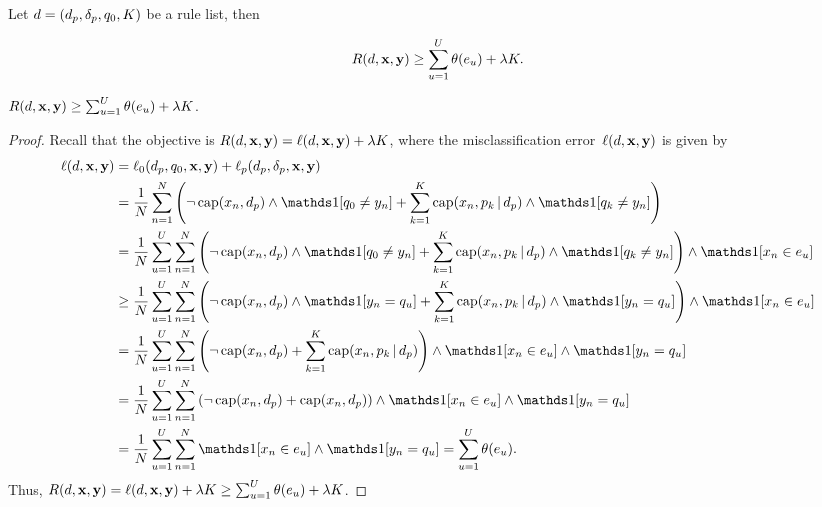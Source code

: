 \begin{proposition}
\label{prop:identical}
Let ${{d} = (d_p, \delta_p, q_0, K)}$ be a rule list, then
\begin{arxiv}
\begin{align}
R({d}, \mathbf{x}, \mathbf{y}) \ge \sum_{u=1}^U \theta(e_u) + {\lambda} K.
\end{align}
\end{arxiv}
\begin{kdd}
${R({d}, \mathbf{x}, \mathbf{y}) \ge \sum_{u=1}^U \theta(e_u) + {\lambda} K}$.
\end{kdd}
\end{proposition}

\begin{arxiv}
\begin{proof}
Recall that the objective is ${R({d}, \mathbf{x}, \mathbf{y}) = \ell({d}, \mathbf{x}, \mathbf{y}) + {\lambda} K}$,
where the misclassification error~${\ell({d}, \mathbf{x}, \mathbf{y})}$ is given by
\begin{align}
\Loss(\RL, \x, \y) &= \Loss_0(\Prefix, \Default, \x, \y) + \Loss_p(\Prefix, \Labels, \x, \y) \nn \\
&= \frac{1}{N} \sum_{n=1}^N \left( \neg\, \Cap(x_n, \Prefix) \wedge \one[q_0 \neq y_n]
   + \sum_{k=1}^K \Cap(x_n, p_k \given \Prefix) \wedge \one [q_k \neq y_n] \right) \nn \\
&= \frac{1}{N} \sum_{u=1}^U \sum_{n=1}^N \left( \neg\, \Cap(x_n, \Prefix) \wedge \one[q_0 \neq y_n]
   + \sum_{k=1}^K \Cap(x_n, p_k \given \Prefix) \wedge \one [q_k \neq y_n] \right)
   \wedge \one [x_n \in e_u]  \nn \\
&\ge \frac{1}{N} \sum_{u=1}^U \sum_{n=1}^N \left( \neg\, \Cap(x_n, \Prefix) \wedge \one[y_n = q_u]
   + \sum_{k=1}^K \Cap(x_n, p_k \given \Prefix) \wedge \one [y_n = q_u] \right)
   \wedge \one [x_n \in e_u] \nn \\
&= \frac{1}{N} \sum_{u=1}^U \sum_{n=1}^N \left( \neg\, \Cap(x_n, \Prefix)
   + \sum_{k=1}^K \Cap(x_n, p_k \given \Prefix) \right)
   \wedge \one [x_n \in e_u] \wedge \one[y_n = q_u] \nn \\
&= \frac{1}{N} \sum_{u=1}^U \sum_{n=1}^N \left( \neg\, \Cap(x_n, \Prefix)
   + \Cap(x_n, \Prefix) \right)
   \wedge \one [x_n \in e_u] \wedge \one[y_n = q_u] \nn \\
&= \frac{1}{N} \sum_{u=1}^U \sum_{n=1}^N \one [ x_n \in e_u ] \wedge \one [ y_n = q_u ]
= \sum_{u=1}^U \theta(e_u). \nn
\end{align}
Thus, ${R({d}, \mathbf{x}, \mathbf{y}) = \ell({d}, \mathbf{x}, \mathbf{y}) + {\lambda} K \ge \sum_{u=1}^U \theta(e_u) + {\lambda} K}$.
\end{proof}
\end{arxiv}


